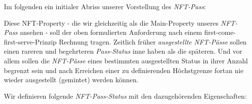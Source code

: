 \vspace{0.3cm}


\vspace{0.3cm}

Im folgenden ein initialer Abriss unserer Vorstellung des \textit{NFT-Pass}:

\vspace{0.3cm}

\begin{NFT-Prop}

Diese NFT-Property - die wir gleichzeitig als die Main-Property unseres \textit{NFT-Pass} ansehen - soll der oben formulierten Anforderung nach einem first-come-first-serve-Prinzip Rechnung tragen. Zeitlich früher \textit{ausgestellte NFT-Pässe} sollen einen rareren und begehrteren \textit{Pass-Status} inne haben als die späteren. Und vor allem sollen die \textit{NFT-Pässe} eines bestimmten ausgestellten Status in ihrer Anzahl begrenzt sein und nach Erreichen einer zu definierenden Höchstgrenze fortan nie wieder ausgestellt (gemintet) werden können.

\vspace{0.3cm}

Wir definieren folgende \textit{NFT-Pass-Status} mit den dazugehörenden Eigenschaften:


\end{NFT-Prop}

